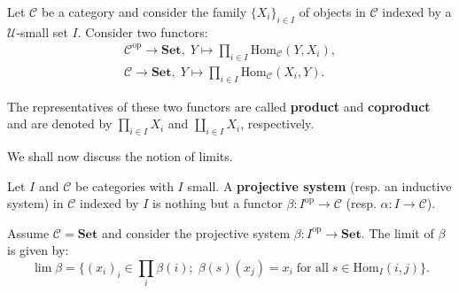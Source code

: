 \documentclass{category-template}
\begin{document}
\begin{definition}
    Let $\mathcal{C}$ be a category and consider the family $\{X_i\}_{i \in I}$
    of objects in $\mathcal{C}$ indexed by a $\mathcal{U}$-small set $I$. Consider 
    two functors:
    \begin{gather*}
        \mathcal{C}^{\text{op}} \to \textbf{Set}, \; Y \mapsto \prod_{i \in I}\text{Hom}_{\mathcal{C}}(Y,X_i), \\
        \mathcal{C} \to \textbf{Set}, \; Y \mapsto \prod_{i \in I}\text{Hom}_{\mathcal{C}}(X_i, Y).
    \end{gather*}

    The representatives of these two functors are called \textbf{product} and
    \textbf{coproduct} and are denoted by $\prod_{i \in I}X_i$ and $\coprod_{i
    \in I}X_i$, respectively.
\end{definition}

We shall now discuss the notion of limits.
\begin{definition}
    Let $I$ and $\mathcal{C}$ be categories with $I$ small. A \textbf{projective
    system} (resp. an inductive system) in $\mathcal{C}$ indexed by $I$ is
    nothing but a functor $\beta: I^{\text{op}} \to \mathcal{C}$ (resp. $\alpha:
    I \to \mathcal{C}$).
\end{definition}

\begin{definition}
    Assume $\mathcal{C} = \textbf{Set}$ and consider the projective 
    system $\beta: I^{\text{op}} \to \textbf{Set}$. The limit of $\beta$ 
    is given by:
    \begin{equation*}
        \lim \beta = \{(x_i)_i \in \prod_i\beta(i); \; \beta(s)(x_j) = x_i \; \text{for all} \; s \in \text{Hom}_I(i,j)\}.
    \end{equation*}
\end{definition}
\end{document}
